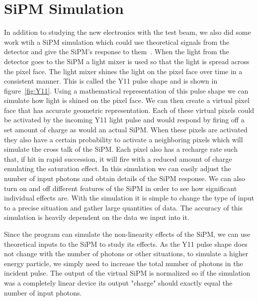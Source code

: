 \section{SiPM Simulation}

In addition to studying the new electronics with the test beam, we also did some work wtih a SiPM simulation which could use theoretical signals from the detector and give the SiPM's response to them~\cite{SiPMSimulation_github}. When the light from the detector goes to the SiPM a  light mixer is used so that the light is spread across the pixel face. The light mixer shines the light on the pixel face over time in a consistent manner. This is called the Y11 pulse shape and is shown in figure~\ref{fig:Y11}. Using a mathematical representation of this pulse shape we can simulate how light is shined on the pixel face. We can then create a virtual pixel face that has accurate geometric representation. Each of these virtual pixels could be activated by the incoming Y11 light pulse and would respond by firing off a set amount of charge as would an actual SiPM. When these pixels are activated they also have a certain probability to activate a neighboring pixels which will simulate the cross talk of the SiPM. Each pixel also has a recharge rate such that, if hit in rapid succession, it will fire with a reduced amount of charge emulating the saturation effect. In this simulation we can easily adjust the number of input photons and obtain details of the SiPM response. We can also turn on and off different features of the SiPM in order to see how significant individual effects are. With the simulation it is simple to change the type of input to a precise situation and gather large quantities of data. The accuracy of this simulation is heavily dependent on the data we input into it.

Since the program can simulate the non-linearity effects of the SiPM, we can use theoretical inputs to the SiPM to study its effects. As the Y11 pulse shape does not change with the number of photons or other situations, to simulate a higher energy particle, we simply need to increase the total number of photons in the incident pulse. The output of the virtual SiPM is normalized so if the simulation was a completely linear device its output "charge" should exactly equal the number of input photons. 

